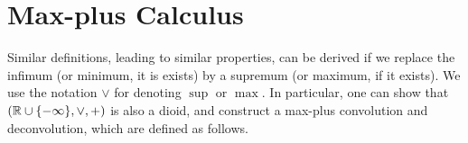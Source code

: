 


\section{Max-plus Calculus}
Similar definitions, leading to similar properties, can be derived if we replace
the infimum (or minimum, it is exists) by a supremum (or maximum, if it exists).
We use the notation $\vee$ for denoting $\sup$ or $\max$.
In particular, one can show that $( \mathbb{R} \cup \{ -\infty \}, \vee, +)$ is also a dioid,
and construct a max-plus convolution and deconvolution, which are defined as follows.

